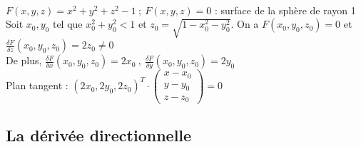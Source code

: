\documentclass[12pt,a4paper]{article}
\begin{document}
 \\
$F(x,y,z) = x^2 + y^2 + z^2 -1\ ; \ F(x,y,z) = 0$ : surface de la sphère de rayon 1\\
Soit $x_0,y_0$ tel que $x_0^2 + y_0^2 < 1$ et $z_0 = \sqrt{1-x_0^2-y_0^2}$. On a $F(x_0,y_0,z_0) = 0$ et $\frac{\delta F}{\delta z}(x_0,y_0,z_0) = 2z_0 \neq 0$\\
De plus, $\frac{\delta F}{\delta x}(x_0,y_0,z_0) = 2x_0\ , \ \frac{\delta F}{\delta y}(x_0,y_0,z_0) = 2y_0$\\
Plan tangent : $(2x_0,2y_0,2z_0)^T \cdot \begin{pmatrix}
x-x_0\\
y-y_0\\
z-z_0
\end{pmatrix} = 0$


\subsection{La dérivée directionnelle}
\end{document}
